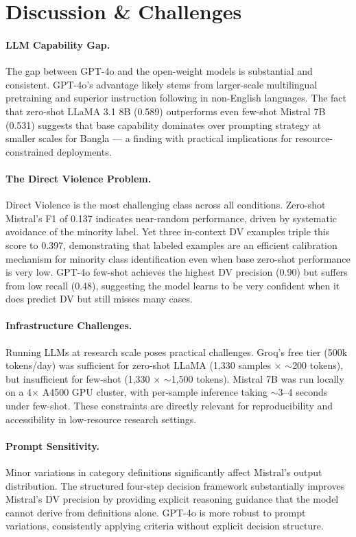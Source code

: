 \documentclass[sigconf,nonacm]{acmart}
\begin{document}
\section{Discussion \& Challenges}

\paragraph{LLM Capability Gap.}
The gap between GPT-4o and the open-weight models is substantial and consistent. GPT-4o's advantage likely stems from larger-scale multilingual pretraining and superior instruction following in non-English languages. The fact that zero-shot LLaMA 3.1 8B (0.589) outperforms even few-shot Mistral 7B (0.531) suggests that base capability dominates over prompting strategy at smaller scales for Bangla — a finding with practical implications for resource-constrained deployments.

\paragraph{The Direct Violence Problem.}
Direct Violence is the most challenging class across all conditions. Zero-shot Mistral's F1 of 0.137 indicates near-random performance, driven by systematic avoidance of the minority label. Yet three in-context DV examples triple this score to 0.397, demonstrating that labeled examples are an efficient calibration mechanism for minority class identification even when base zero-shot performance is very low. GPT-4o few-shot achieves the highest DV precision (0.90) but suffers from low recall (0.48), suggesting the model learns to be very confident when it does predict DV but still misses many cases.

\paragraph{Infrastructure Challenges.}
Running LLMs at research scale poses practical challenges. Groq's free tier (500k tokens/day) was sufficient for zero-shot LLaMA (1,330 samples $\times$ $\sim$200 tokens), but insufficient for few-shot (1,330 $\times$ $\sim$1,500 tokens). Mistral 7B was run locally on a 4$\times$ A4500 GPU cluster, with per-sample inference taking $\sim$3--4 seconds under few-shot. These constraints are directly relevant for reproducibility and accessibility in low-resource research settings.

\paragraph{Prompt Sensitivity.}
Minor variations in category definitions significantly affect Mistral's output distribution. The structured four-step decision framework substantially improves Mistral's DV precision by providing explicit reasoning guidance that the model cannot derive from definitions alone. GPT-4o is more robust to prompt variations, consistently applying criteria without explicit decision structure.
\end{document}
